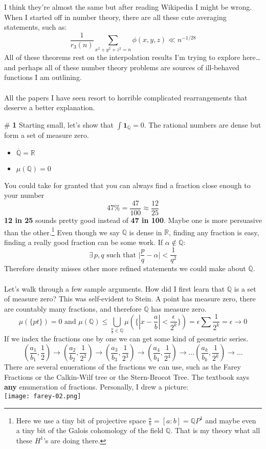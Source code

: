 \documentclass[12pt]{article}
\begin{document}
I think they're almost the same but after reading Wikipedia I might be wrong.  When I started off in number theory, there are all these cute averaging statements, such as:
$$  \frac{1}{r_3(n)}\sum_{x^2 + y^2 + z^2 = n} \phi(x,y,z) \ll n^{-1/28} $$
All of these theorems rest on the interpolation results I'm trying to explore here\dots and perhaps all of these number theory problems are sources of ill-behaved functions I am outlining.  \\ \\
All the papers I have seen resort to horrible complicated rearrangements that deserve a better explanation.  

\newpage

\noindent \# \textbf{1} Starting small, let's show that $ \int \mathbf{1}_\mathbb{Q} = 0 $.  The rational numbers are dense but form a set of measure zero.
\begin{itemize}
\item $\overline{\mathbb{Q}}= \mathbb{R}$
\item $\mu(\mathbb{Q}) = 0$
\end{itemize}
You could take for granted that you can always find a fraction close enough to your number 
$$ 47\% = \frac{47}{100} \approx \frac{12}{25} $$
\textbf{12 in 25} sounds pretty good instead of \textbf{47 in 100}.  Maybe one is more persuasive than the other.\footnote{Here we use a tiny bit of projective space $\frac{a}{b} = [a:b] = \mathbb{Q}P^1$ and maybe even a tiny bit of the Galois cohomology of the field $\mathbb{Q}$.  That is my theory what all these $H^1$'s are doing there. }  Even though we say $\mathbb{Q}$ is dense in $\mathbb{R}$, finding any fraction is easy, finding a really good fraction can be some work.  If $\alpha \notin \mathbb{Q}$: 
$$ \exists \, p,q \text{ such that }  \bigg| \frac{p}{q} - \alpha \bigg| < \frac{1}{q^2} $$
Therefore density misses other more refined statements we could make about $\overline{\mathbb{Q}}$. \\ \\
Let's walk through a few sample arguments.  How did I first learn that $\mathbb{Q}$  is a set of measure zero?  This was self-evident to Stein.  A point has measure zero, there are countably many fractions, and therefore $\mathbb{Q}$ has measure zero.
$$ \mu (\{ pt\}) = 0 \text{ and } 
\mu(\mathbb{Q}) \leq \bigcup_{\frac{a}{b} \in \mathbb{Q}} 
\mu(\big\{ | x - \frac{a}{b} | < \frac{\epsilon}{2^k} \big\} ) = 
\epsilon \sum \frac{1}{2^k} = \epsilon \to 0$$
If we index the fractions one by one we can get some kind of geometric series.
$$ (\frac{a_1}{b_1}, \frac{1}{2}) \to 
 (\frac{a_2}{b_2}, \frac{1}{2^2}) \to 
  (\frac{a_3}{b_3}, \frac{1}{2^3}) \to 
   (\frac{a_4}{b_4}, \frac{1}{2^4}) \to \dots 
    (\frac{a_k}{b_k}, \frac{1}{2^k}) \to \dots  $$
There are several enuerations of the fractions we can use, such as the Farey Fractions or the Calkin-Wilf tree or the Stern-Brocot Tree.  The textbook says \textbf{any} enumeration of fractions. Personally, I drew a picture: \\ 
\texttt{[image: farey-02.png]}
\end{document}
